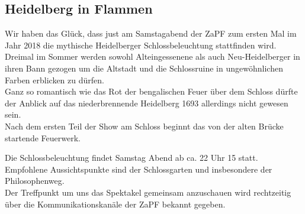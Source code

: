 \subsection*{Heidelberg in Flammen} %

Wir haben das Glück, dass just am Samstagabend der ZaPF zum ersten Mal im Jahr 2018 die mythische Heidelberger Schlossbeleuchtung stattfinden wird.\\
Dreimal im Sommer werden sowohl Alteingessenene als auch Neu-Heidelberger in ihren Bann gezogen um die Altstadt und die Schlossruine in ungewöhnlichen Farben erblicken zu dürfen.\\
Ganz so romantisch wie das Rot der bengalischen Feuer über dem Schloss dürfte der Anblick auf das niederbrennende Heidelberg 1693 allerdings nicht gewesen sein.\\Nach dem ersten Teil der Show am Schloss beginnt das von der alten Brücke startende Feuerwerk. 

Die Schlossbeleuchtung findet Samstag Abend ab ca. 22 Uhr 15 statt. Empfohlene Aussichtspunkte sind der Schlossgarten und insbesondere der Philosophenweg. \\
Der Treffpunkt um uns das Spektakel gemeinsam anzuschauen wird rechtzeitig über die Kommunikationskanäle der ZaPF bekannt gegeben.
